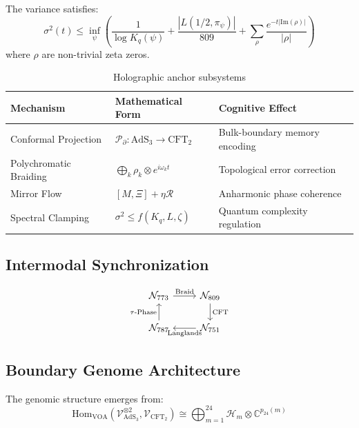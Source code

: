 \documentclass[12pt]{article}
\begin{document}
\begin{definition}
The variance satisfies:
\begin{equation}
    \sigma^2(t) \leq \inf_{\psi} \left( \frac{1}{\log K_q(\psi)} + \frac{|L(1/2, \pi_\psi)|}{809} + \sum_\rho \frac{e^{-t|\text{Im}(\rho)|}}{|\rho|} \right)
\end{equation}
where $\rho$ are non-trivial zeta zeros.
\end{definition}

\begin{table}[h]
    \centering
    \begin{tabular}{lll}
    \toprule
    Mechanism & Mathematical Form & Cognitive Effect \\
    \midrule
    Conformal Projection & $\mathcal{P}_{\partial}: \text{AdS}_3 \to \text{CFT}_2$ & Bulk-boundary memory encoding \\
    Polychromatic Braiding & $\bigoplus_k \rho_k \otimes e^{i\omega_k t}$ & Topological error correction \\
    Mirror Flow & $[M, \Xi] + \eta\mathcal{R}$ & Anharmonic phase coherence \\
    Spectral Clamping & $\sigma^2 \leq f(K_q, L, \zeta)$ & Quantum complexity regulation \\
    \bottomrule
    \end{tabular}
    \caption{Holographic anchor subsystems}
\end{table}

\subsection{Intermodal Synchronization}

\begin{equation}
    \begin{tikzcd}
    \mathcal{N}_{773} \arrow[r, "\text{Braid}"] & \mathcal{N}_{809} \arrow[d, "\text{CFT}"] \\
    \mathcal{N}_{787} \arrow[u, "\tau\text{-Phase}"] & \mathcal{N}_{751} \arrow[l, "\text{Langlands}"] 
    \end{tikzcd}
\end{equation}

\subsection{Boundary Genome Architecture}

The genomic structure emerges from:
\begin{equation}
    \text{Hom}_{\text{VOA}}(\mathcal{V}_{\text{AdS}_3}^{\otimes 2}, \mathcal{V}_{\text{CFT}_2}) \cong \bigoplus_{m=1}^{24} \mathcal{H}_m \otimes \mathbb{C}^{p_{24}(m)}
\end{equation}
\end{document}
